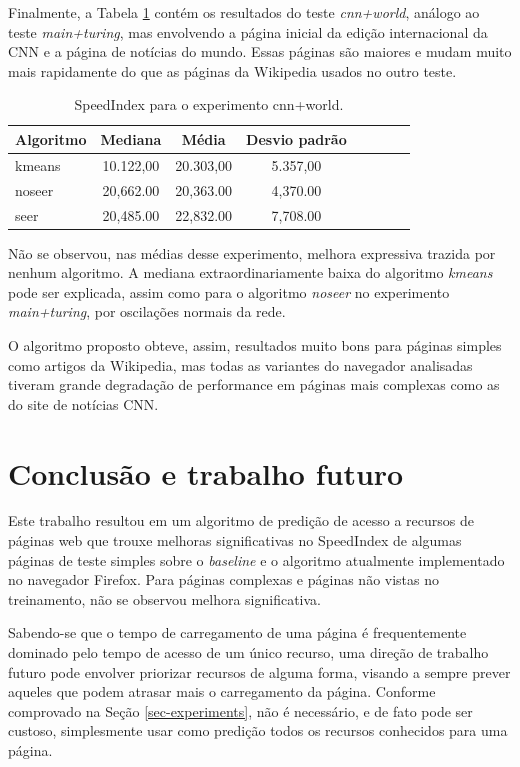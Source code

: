 \documentclass[10pt,twocolumn,letterpaper]{article}
\begin{document}
Finalmente, a Tabela \ref{tbl-cnn-main-world} contém os resultados do teste \emph{cnn+world}, análogo ao teste \emph{main+turing}, mas envolvendo a página inicial da edição internacional da CNN e a página de notícias do mundo. Essas páginas são maiores e mudam muito mais rapidamente do que as páginas da Wikipedia usados no outro teste.

\begin{table}
\begin{center}
\begin{tabular}{l*{6}{c}r}
\hline
Algoritmo & Mediana & Média & Desvio padrão \\
\hline
kmeans & 10.122,00 & 20.303,00 & 5.357,00 \\
noseer  & 20,662.00 & 20,363.00 & 4,370.00 \\
seer & 20,485.00 & 22,832.00 & 7,708.00 \\
\hline
\end{tabular}
\end{center}
\caption{SpeedIndex para o experimento cnn+world.}
\label{tbl-cnn-main-world}
\end{table}

Não se observou, nas médias desse experimento, melhora expressiva trazida por nenhum algoritmo. A mediana extraordinariamente baixa do algoritmo \emph{kmeans} pode ser explicada, assim como para o algoritmo \emph{noseer} no experimento \emph{main+turing}, por oscilações normais da rede.

O algoritmo proposto obteve, assim, resultados muito bons para páginas simples como artigos da Wikipedia, mas todas as variantes do navegador analisadas tiveram grande degradação de performance em páginas mais complexas como as do site de notícias CNN.

\section{Conclusão e trabalho futuro}

Este trabalho resultou em um algoritmo de predição de acesso a recursos de páginas web que trouxe melhoras significativas no SpeedIndex de algumas páginas de teste simples sobre o \emph{baseline} e o algoritmo atualmente implementado no navegador Firefox. Para páginas complexas e páginas não vistas no treinamento, não se observou melhora significativa.

Sabendo-se que o tempo de carregamento de uma página é frequentemente dominado pelo tempo de acesso de um único recurso, uma direção de trabalho futuro pode envolver priorizar recursos de alguma forma, visando a sempre prever aqueles que podem atrasar mais o carregamento da página. Conforme comprovado na Seção \ref{sec-experiments}, não é necessário, e de fato pode ser custoso, simplesmente usar como predição todos os recursos conhecidos para uma página.
\end{document}
